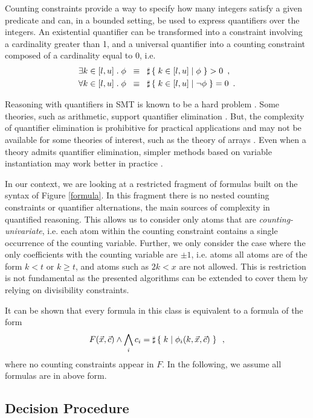 Counting constraints provide a way to specify how many integers
satisfy a given predicate and can, in a bounded setting, be used to
express quantifiers over the integers. An existential quantifier can
be transformed into a constraint involving a cardinality greater than
1, and a universal quantifier into a counting constraint composed of a
cardinality equal to 0, i.e.
\begin{align*}
  \exists k \in [l, u]\;.\; \phi &\;\;\equiv\;\; \sharp\left\lbrace\;k \in [l, u] \;|\;\phi\;\right\rbrace > 0 \enspace,\\
  \forall k \in [l, u]\;.\; \phi &\;\;\equiv\;\; \sharp\left\lbrace\;k \in [l, u] \;|\;\neg \phi\;\right\rbrace = 0 \enspace.
\end{align*}

Reasoning with quantifiers in SMT is known to be a hard problem
\cite{ge2010solving,weispfenning1988complexity}. Some theories, such
as arithmetic, support quantifier elimination \cite{cooper}. But, the
complexity of quantifier elimination is prohibitive for practical
applications and may not be available for some theories of interest,
such as the theory of arrays \cite{bradley2006s}. Even when a theory
admits quantifier elimination,  simpler methods based on variable
instantiation may work better in practice \cite{dutertre2015solving}.

In our context, we are looking at a restricted fragment of formulas
built on the syntax of Figure \ref{formula}. In this fragment there is
no nested counting constraints or quantifier alternations, the main
sources of complexity in quantified reasoning. This allows us to
consider only atoms that are \emph{counting-univariate}, i.e. each
atom within the counting constraint contains a single occurrence of
the counting variable. Further, we only consider the case where the
only coefficients with the counting variable are $\pm 1$, i.e. atoms
all atoms are of the form $k < t$ or $k \geq t$, and atoms such as $2k <
x$ are not allowed. This is restriction is not fundamental as the
presented algorithms can be extended to cover them by relying on
divisibility constraints.

It can be shown that every formula in this class is equivalent to a
formula of the form
\begin{equation}
\label{maingoal}
F(\vec{x}, \vec{c}) \land \bigwedge_i c_i = \sharp\left\lbrace\;k\;|\;\phi_i(k, \vec{x}, \vec{c})\;\right\rbrace\enspace,
\end{equation}
where no counting constraints appear in $F$. In the following, we
assume all formulas are in above form.

\subsection{Decision Procedure}

